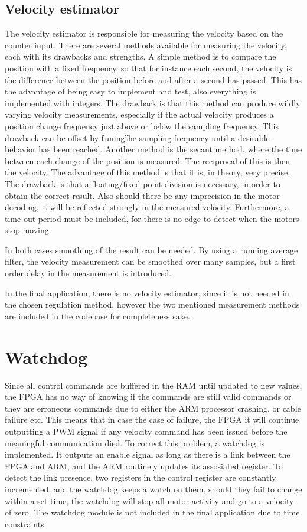 \subsection{Velocity estimator}
The velocity estimator is responsible for measuring the velocity based on the counter input.
There are several methods available for measuring the velocity, each with its drawbacks and strengths.
A simple method is to compare the position with a fixed frequency, so that for instance each second, the velocity is the difference between the position before and after a second has passed. This has the advantage of being easy to implement and test, also everything is implemented with integers. The drawback is that this method can produce wildly varying velocity measurements, especially if the actual velocity produces a position change frequency just above or below the sampling frequency.
This drawback can be offset by \"tuning\" the sampling frequency until a desirable behavior has been reached.
Another method is the secant method, where the time between each change of the position is measured. The reciprocal of this is then the velocity. The advantage of this method is that it is, in theory, very precise. The drawback is that a floating/fixed point division is necessary, in order to obtain the correct result. Also should there be any imprecision in the motor decoding, it will be reflected strongly in the measured velocity. Furthermore, a time-out period must be included, for there is no edge to detect when the motors stop moving.

In both cases smoothing of the result can be needed. By using a running average filter, the velocity measurement can be smoothed over many samples, but a first order delay in the measurement is introduced.

In the final application, there is no velocity estimator, since it is not needed in the chosen regulation method, however the two mentioned measurement methods are included in the codebase for completeness sake.


\section{Watchdog}
Since all control commands are buffered in the RAM until updated to new values, the FPGA has no way of knowing if the commands are still valid commands or they are erroneous commands due to either the ARM processor crashing, or cable failure etc. This means that in case the case of failure, the FPGA it will continue outputting a PWM signal if any velocity command has been issued before the meaningful communication died. To correct this problem, a watchdog is implemented. It outputs an enable signal as long as there is a link between the FPGA and ARM, and the ARM routinely updates its assosiated register. 
To detect the link presence, two registers in the control register are constantly incremented, and the watchdog keeps a watch on them, should they fail to change within a set time, the watchdog will stop all motor activity and go to a velocity of zero.
The watchdog module is not included in the final application due to time constraints.

